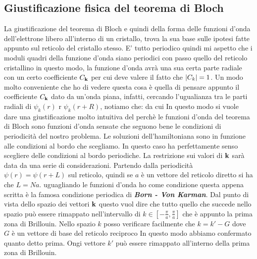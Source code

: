 \subsection{Giustificazione fisica del teorema di Bloch}
La giustificazione del teorema di Bloch e quindi della forma delle funzioni d'onda dell'elettrone libero all'interno di un cristallo, trova la sua base sulle ipotesi fatte appunto sul reticolo del cristallo stesso. E' tutto periodico quindi mi aspetto che i moduli quadri della funzione d'onda siano periodici con passo quello del reticolo cristallino
in questo modo, la funzione d'onda avrà una sua certa parte radiale con un certo coefficiente $C_{\it\bf k}$ per cui deve valere il fatto che $\abs{C_k} =1$. Un modo molto conveniente che ho di vedere questa cosa è quella di pensare appunto il coefficiente $C_{\it\bf k}$ dato da un'onda piana, infatti, cercando l'ugualianza tra le parti radiali di $\psi_k(r)$ r $\psi_k(r+R)$, notiamo che:
da cui
In questo modo si vuole dare una giustificazione molto intuitiva del perchè le funzioni d'onda del teorema di Bloch sono funzioni d'onda sensate che seguono bene le condizioni di periodicità del nostro problema. Le soluzioni dell'hamiltoniana sono in funzione alle condizioni al bordo che scegliamo. In questo caso ha perfettamente senso scegliere delle condizioni al bordo periodiche. La restrizione sui valori di $\it\bf k$ sarà data da una serie di considerazioni. Partendo dalla periodicità $\psi(r) = \psi(r+L)$ sul reticolo, quindi se $a$ è un vettore del reticolo diretto si ha che $L = Na$. uguagliando le funzioni d'onda
ho come condizione
questa appena scritta è la famosa condizione periodica di \textit{\textbf{Born - Von Karman}}. Dal punto di vista dello spazio dei vettori $\it\bf k$ questo vuol dire che tutto quello che succede nello spazio può essere rimappato nell'intervallo di $k\in\left[-\frac{\pi}{a},\frac{\pi}{a}\right]$ che è appunto la prima zona di Brillouin. Nello spazio $k$ posso verificare facilmente che $k = k'-G$ dove $G$ è un vettore di base del reticolo reciproco
In questo modo abbiamo confermato quanto detto prima. Ongi vettore $k'$ può essere rimappato all'interno della prima zona di Brillouin.
